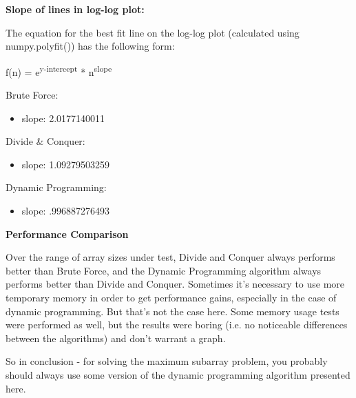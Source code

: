 \documentclass[letterpaper,10pt,titlepage,fleqn]{article}
\begin{document}
\newpage

\begin{centering}
\textbf{Slope of lines in log-log plot:}
\end{centering}

The equation for the best fit line on the log-log plot (calculated using numpy.polyfit()) has the following form:

f(n) = e\textsuperscript{y-intercept} * n\textsuperscript{slope}

Brute Force:
\begin{itemize}
\item slope: 2.0177140011
\end{itemize}

Divide \& Conquer:
\begin{itemize}
\item slope: 1.09279503259
\end{itemize}

Dynamic Programming:
\begin{itemize}
\item slope: .996887276493
\end{itemize}

\begin{centering}
\textbf{Performance Comparison}
\end{centering}

Over the range of array sizes under test, Divide and Conquer always performs better than Brute Force, and the Dynamic Programming algorithm always performs better than Divide and Conquer. Sometimes it's necessary to use more temporary memory in order to get performance gains, especially in the case of dynamic programming. But that's not the case here. Some memory usage tests were performed as well, but the results were boring (i.e. no noticeable differences between the algorithms) and don't warrant a graph. 

So in conclusion - for solving the maximum subarray problem, you probably should always use some version of the dynamic programming algorithm presented here.
\end{document}
